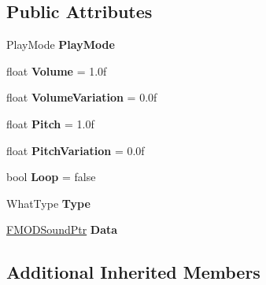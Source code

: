 \subsection*{Public Attributes}
\begin{DoxyCompactItemize}
\item 
\hypertarget{classDCEngine_1_1SoundCue_ab805dbcd2ec0e5fbe13930bd33bf18e2}{Play\-Mode {\bfseries Play\-Mode}}\label{classDCEngine_1_1SoundCue_ab805dbcd2ec0e5fbe13930bd33bf18e2}

\item 
\hypertarget{classDCEngine_1_1SoundCue_a3e01bc3acb9f762c78c766682e4b66bd}{float {\bfseries Volume} = 1.\-0f}\label{classDCEngine_1_1SoundCue_a3e01bc3acb9f762c78c766682e4b66bd}

\item 
\hypertarget{classDCEngine_1_1SoundCue_ae76ed64d1e23857a38ce250bc5755ae5}{float {\bfseries Volume\-Variation} = 0.\-0f}\label{classDCEngine_1_1SoundCue_ae76ed64d1e23857a38ce250bc5755ae5}

\item 
\hypertarget{classDCEngine_1_1SoundCue_ab04511555ec70032b5e1a3ee41ee29a4}{float {\bfseries Pitch} = 1.\-0f}\label{classDCEngine_1_1SoundCue_ab04511555ec70032b5e1a3ee41ee29a4}

\item 
\hypertarget{classDCEngine_1_1SoundCue_a170d52e16f1fab11c24e73b593ea40ba}{float {\bfseries Pitch\-Variation} = 0.\-0f}\label{classDCEngine_1_1SoundCue_a170d52e16f1fab11c24e73b593ea40ba}

\item 
\hypertarget{classDCEngine_1_1SoundCue_ade6163fc6f19ed727a14f20d49b5dcc3}{bool {\bfseries Loop} = false}\label{classDCEngine_1_1SoundCue_ade6163fc6f19ed727a14f20d49b5dcc3}

\item 
\hypertarget{classDCEngine_1_1SoundCue_a8d683df56623b04de60023565c7d3301}{What\-Type {\bfseries Type}}\label{classDCEngine_1_1SoundCue_a8d683df56623b04de60023565c7d3301}

\item 
\hypertarget{classDCEngine_1_1SoundCue_abae800d5594a6af98d9576c9fa6c1e12}{\hyperlink{classDCEngine_1_1FMODSoundPtr}{F\-M\-O\-D\-Sound\-Ptr} {\bfseries Data}}\label{classDCEngine_1_1SoundCue_abae800d5594a6af98d9576c9fa6c1e12}

\end{DoxyCompactItemize}
\subsection*{Additional Inherited Members}


